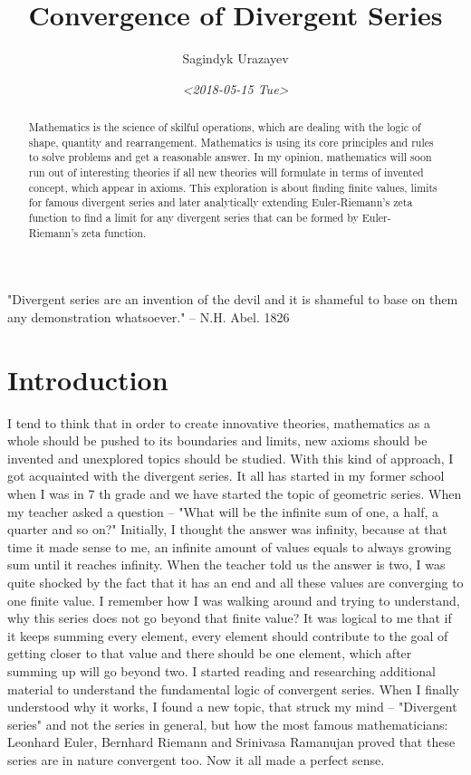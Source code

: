 \documentclass[a4paper]{article}
\author{Sagindyk Urazayev}
\date{\textit{<2018-05-15 Tue>}}
\title{Convergence of Divergent Series}
\begin{document}
\maketitle
\tableofcontents

\listoffigures
\listoftables

\newpage
\begin{center}
"Divergent series are an invention of the devil and it is shameful to base on
them any demonstration whatsoever."\cite{Abel} -- N.H. Abel. 1826
\end{center}

\begin{abstract}
Mathematics is the science of skilful operations, which are dealing with the
logic of shape, quantity and rearrangement. Mathematics is using its core
principles and rules to solve problems and get a reasonable answer. In my
opinion, mathematics will soon run out of interesting theories if all new
theories will formulate in terms of invented concept, which appear in
axioms. This exploration is about finding finite values, limits for famous
divergent series and later analytically extending Euler-Riemann's zeta function
to find a limit for any divergent series that can be formed by Euler- Riemann's
zeta function.
\end{abstract}

\section{Introduction}
\label{sec:orgbbe345e}
\label{org178d42d}

I tend to think that in order to create innovative theories, mathematics as a
whole should be pushed to its boundaries and limits, new axioms should be
invented and unexplored topics should be studied. With this kind of approach, I
got acquainted with the divergent series. It all has started in my former school
when I was in 7 th grade and we have started the topic of geometric series. When
my teacher asked a question – "What will be the infinite sum of one, a half, a
quarter and so on?" Initially, I thought the answer was infinity, because at
that time it made sense to me, an infinite amount of values equals to always
growing sum until it reaches infinity. When the teacher told us the answer is
two, I was quite shocked by the fact that it has an end and all these values are
converging to one finite value. I remember how I was walking around and trying
to understand, why this series does not go beyond that finite value? It was
logical to me that if it keeps summing every element, every element should
contribute to the goal of getting closer to that value and there should be one
element, which after summing up will go beyond two. I started reading and
researching additional material to understand the fundamental logic of
convergent series. When I finally understood why it works, I found a new topic,
that struck my mind – "Divergent series" and not the series in general, but how
the most famous mathematicians: Leonhard Euler, Bernhard Riemann and Srinivasa
Ramanujan proved that these series are in nature convergent too. Now it all made
a perfect sense.  
\end{document}
